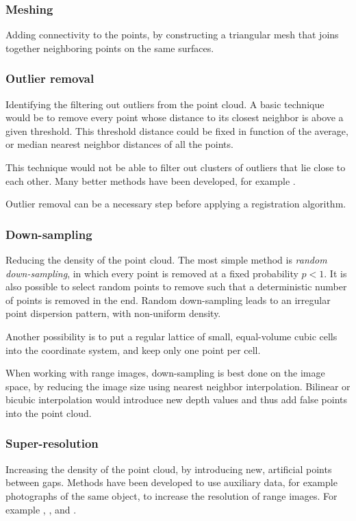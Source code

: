 \subsubsection{Meshing}
Adding connectivity to the points, by constructing a triangular mesh that joins together neighboring points on the same surfaces. 


\subsubsection{Outlier removal}
Identifying the filtering out outliers from the point cloud. A basic technique would be to remove every point whose distance to its closest neighbor is above a given threshold. This threshold distance could be fixed in function of the average, or median nearest neighbor distances of all the points.

This technique would not be able to filter out clusters of outliers that lie close to each other. Many better methods have been developed, for example \cite{Soto2006}.

Outlier removal can be a necessary step before applying a registration algorithm.

\subsubsection{Down-sampling}
Reducing the density of the point cloud. The most simple method is \emph{random down-sampling}, in which every point is removed at a fixed probability $p < 1$. It is also possible to select random points to remove such that a deterministic number of points is removed in the end. Random down-sampling leads to an irregular point dispersion pattern, with non-uniform density.

Another possibility is to put a regular lattice of small, equal-volume cubic cells into the coordinate system, and keep only one point per cell.

When working with range images, down-sampling is best done on the image space, by reducing the image size using nearest neighbor interpolation. Bilinear or bicubic interpolation would introduce new depth values and thus add false points into the point cloud.

\subsubsection{Super-resolution}
Increasing the density of the point cloud, by introducing new, artificial points between gaps. Methods have been developed to use auxiliary data, for example photographs of the same object, to increase the resolution of range images. For example \cite{Yang2007}, \cite{Bart2009}, \cite{Soh2012} and \cite{Lo2013}.

